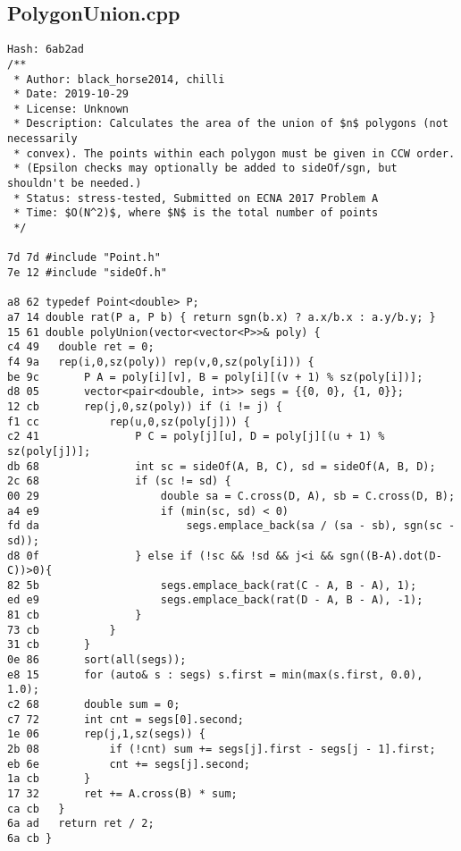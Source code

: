 \documentclass[11pt, a4paper, twoside]{article}
\begin{document}
\subsection{PolygonUnion.cpp}
\begin{lstlisting}
Hash: 6ab2ad
/**
 * Author: black_horse2014, chilli
 * Date: 2019-10-29
 * License: Unknown
 * Description: Calculates the area of the union of $n$ polygons (not necessarily
 * convex). The points within each polygon must be given in CCW order.
 * (Epsilon checks may optionally be added to sideOf/sgn, but shouldn't be needed.)
 * Status: stress-tested, Submitted on ECNA 2017 Problem A
 * Time: $O(N^2)$, where $N$ is the total number of points
 */

7d 7d #include "Point.h"
7e 12 #include "sideOf.h"

a8 62 typedef Point<double> P;
a7 14 double rat(P a, P b) { return sgn(b.x) ? a.x/b.x : a.y/b.y; }
15 61 double polyUnion(vector<vector<P>>& poly) {
c4 49 	double ret = 0;
f4 9a 	rep(i,0,sz(poly)) rep(v,0,sz(poly[i])) {
be 9c 		P A = poly[i][v], B = poly[i][(v + 1) % sz(poly[i])];
d8 05 		vector<pair<double, int>> segs = {{0, 0}, {1, 0}};
12 cb 		rep(j,0,sz(poly)) if (i != j) {
f1 cc 			rep(u,0,sz(poly[j])) {
c2 41 				P C = poly[j][u], D = poly[j][(u + 1) % sz(poly[j])];
db 68 				int sc = sideOf(A, B, C), sd = sideOf(A, B, D);
2c 68 				if (sc != sd) {
00 29 					double sa = C.cross(D, A), sb = C.cross(D, B);
a4 e9 					if (min(sc, sd) < 0)
fd da 						segs.emplace_back(sa / (sa - sb), sgn(sc - sd));
d8 0f 				} else if (!sc && !sd && j<i && sgn((B-A).dot(D-C))>0){
82 5b 					segs.emplace_back(rat(C - A, B - A), 1);
ed e9 					segs.emplace_back(rat(D - A, B - A), -1);
81 cb 				}
73 cb 			}
31 cb 		}
0e 86 		sort(all(segs));
e8 15 		for (auto& s : segs) s.first = min(max(s.first, 0.0), 1.0);
c2 68 		double sum = 0;
c7 72 		int cnt = segs[0].second;
1e 06 		rep(j,1,sz(segs)) {
2b 08 			if (!cnt) sum += segs[j].first - segs[j - 1].first;
eb 6e 			cnt += segs[j].second;
1a cb 		}
17 32 		ret += A.cross(B) * sum;
ca cb 	}
6a ad 	return ret / 2;
6a cb }
\end{lstlisting}
\end{document}
